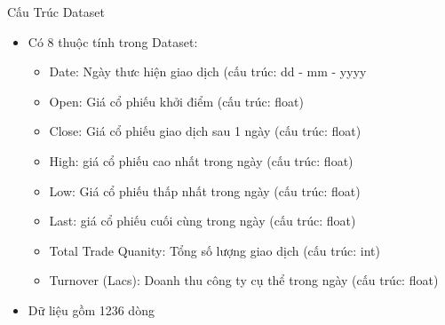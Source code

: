 \documentclass[10pt]{beamer}
\begin{document}
\begin{frame}{Cấu Trúc Dataset}
\begin{itemize}
    \item Có 8 thuộc tính trong Dataset:
    \begin{itemize}
        \item Date: Ngày thưc hiện giao dịch (cấu trúc: dd - mm - yyyy
        \item Open: Giá cổ phiếu khởi điểm (cấu trúc: float)
        \item Close: Giá cổ phiếu giao dịch sau 1 ngày (cấu trúc: float)
        \item High: giá cổ phiếu cao nhất trong ngày (cấu trúc: float)
        \item Low: Giá cổ phiếu thấp nhất trong ngày (cấu trúc: float)
        \item Last: giá cổ phiếu cuối cùng trong ngày (cấu trúc: float)
        \item Total Trade Quanity: Tổng số lượng giao dịch (cấu trúc: int)
        \item Turnover (Lacs): Doanh thu công ty cụ thể trong ngày  (cấu trúc: float)
    \end{itemize}
    \item Dữ liệu gồm 1236 dòng
\end{itemize}
    
\end{frame}
\end{document}
